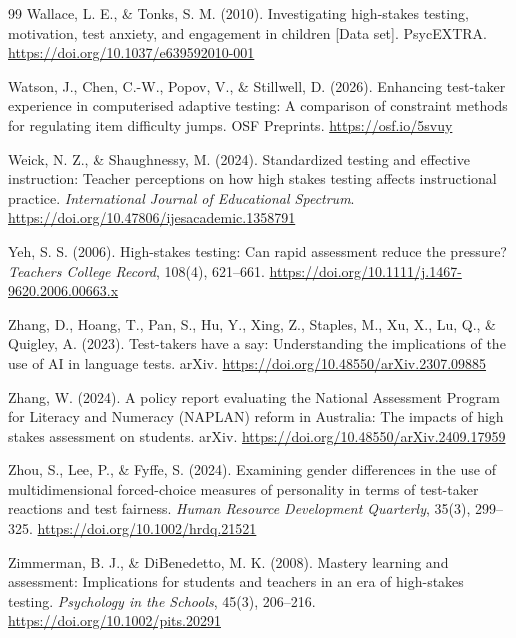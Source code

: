 \documentclass[11pt]{article}
\begin{document}
\begin{thebibliography}{99}
Wallace, L. E., \& Tonks, S. M. (2010). Investigating high-stakes testing, motivation, test anxiety, and engagement in children [Data set]. PsycEXTRA. \url{https://doi.org/10.1037/e639592010-001}

Watson, J., Chen, C.-W., Popov, V., \& Stillwell, D. (2026). Enhancing test-taker experience in computerised adaptive testing: A comparison of constraint methods for regulating item difficulty jumps. OSF Preprints. \url{https://osf.io/5svuy}

Weick, N. Z., \& Shaughnessy, M. (2024). Standardized testing and effective instruction: Teacher perceptions on how high stakes testing affects instructional practice. \textit{International Journal of Educational Spectrum}. \url{https://doi.org/10.47806/ijesacademic.1358791}

Yeh, S. S. (2006). High-stakes testing: Can rapid assessment reduce the pressure? \textit{Teachers College Record}, 108(4), 621--661. \url{https://doi.org/10.1111/j.1467-9620.2006.00663.x}

Zhang, D., Hoang, T., Pan, S., Hu, Y., Xing, Z., Staples, M., Xu, X., Lu, Q., \& Quigley, A. (2023). Test-takers have a say: Understanding the implications of the use of AI in language tests. arXiv. \url{https://doi.org/10.48550/arXiv.2307.09885}

Zhang, W. (2024). A policy report evaluating the National Assessment Program for Literacy and Numeracy (NAPLAN) reform in Australia: The impacts of high stakes assessment on students. arXiv. \url{https://doi.org/10.48550/arXiv.2409.17959}

Zhou, S., Lee, P., \& Fyffe, S. (2024). Examining gender differences in the use of multidimensional forced-choice measures of personality in terms of test-taker reactions and test fairness. \textit{Human Resource Development Quarterly}, 35(3), 299--325. \url{https://doi.org/10.1002/hrdq.21521}

Zimmerman, B. J., \& DiBenedetto, M. K. (2008). Mastery learning and assessment: Implications for students and teachers in an era of high-stakes testing. \textit{Psychology in the Schools}, 45(3), 206--216. \url{https://doi.org/10.1002/pits.20291}


\end{thebibliography}
\end{document}
